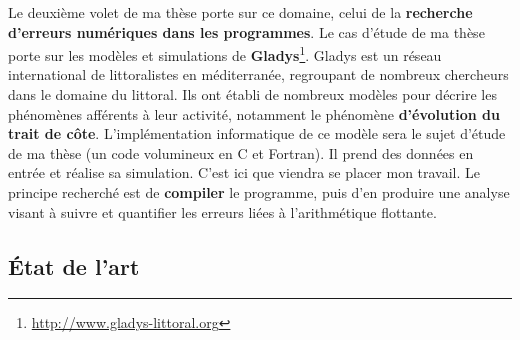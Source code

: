 \documentclass[a4paper,11pt]{article}
\begin{document}
Le deuxième volet de ma thèse porte sur ce domaine, celui de la \textbf{recherche d'erreurs numériques dans les programmes}.
Le cas d’étude de ma thèse porte sur les modèles et simulations de \textbf{Gladys}\footnote{\url{http://www.gladys-littoral.org}}.
Gladys est un réseau international de littoralistes en méditerranée, regroupant de nombreux chercheurs dans le domaine du littoral.
Ils ont établi de nombreux modèles pour décrire les phénomènes afférents à leur activité, notamment le phénomène \textbf{d’évolution du trait de côte}.
L’implémentation informatique de ce modèle sera le sujet d’étude de ma thèse (un code volumineux en C et Fortran). Il prend des données en entrée et réalise sa simulation. C'est ici que viendra se placer mon travail. Le principe recherché est de \textbf{compiler} le programme, puis d’en produire une analyse visant à suivre et quantifier les erreurs liées à l’arithmétique flottante.


\subsection{État de l’art}
\end{document}
